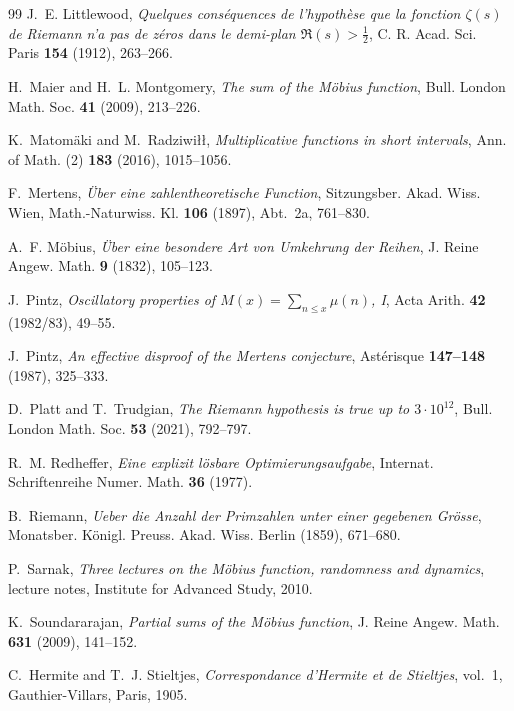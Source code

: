 \documentclass[11pt,reqno]{amsart}
\numberwithin{equation}{section}
\theoremstyle{plain}
\theoremstyle{definition}
\theoremstyle{remark}
\begin{document}
\begin{thebibliography}{99}
J.~E. Littlewood, \emph{Quelques cons\'equences de l'hypoth\`ese que la
fonction $\zeta(s)$ de Riemann n'a pas de z\'eros dans le demi-plan
$\Re(s)>\frac12$}, C. R. Acad. Sci. Paris \textbf{154} (1912), 263--266.

H.~Maier and H.~L. Montgomery, \emph{The sum of the M\"obius function},
Bull. London Math. Soc. \textbf{41} (2009), 213--226.

K.~Matom\"aki and M.~Radziwi\l\l, \emph{Multiplicative functions in short
intervals}, Ann. of Math. (2) \textbf{183} (2016), 1015--1056.

F.~Mertens, \emph{\"Uber eine zahlentheoretische Function}, Sitzungsber.
Akad. Wiss. Wien, Math.-Naturwiss. Kl. \textbf{106} (1897), Abt.~2a,
761--830.

A.~F. M\"obius, \emph{\"Uber eine besondere Art von Umkehrung der Reihen},
J. Reine Angew. Math. \textbf{9} (1832), 105--123.

J.~Pintz, \emph{Oscillatory properties of $M(x)=\sum_{n\le x}\mu(n)$, I},
Acta Arith. \textbf{42} (1982/83), 49--55.

J.~Pintz, \emph{An effective disproof of the Mertens conjecture}, Ast\'erisque
\textbf{147--148} (1987), 325--333.

D.~Platt and T.~Trudgian, \emph{The Riemann hypothesis is true up to
$3\cdot10^{12}$}, Bull. London Math. Soc. \textbf{53} (2021), 792--797.

R.~M. Redheffer, \emph{Eine explizit l\"osbare Optimierungsaufgabe}, Internat.
Schriftenreihe Numer. Math. \textbf{36} (1977).

B.~Riemann, \emph{Ueber die Anzahl der Primzahlen unter einer gegebenen
Gr\"osse}, Monatsber. K\"onigl. Preuss. Akad. Wiss. Berlin (1859), 671--680.

P.~Sarnak, \emph{Three lectures on the M\"obius function, randomness and
dynamics}, lecture notes, Institute for Advanced Study, 2010.

K.~Soundararajan, \emph{Partial sums of the M\"obius function}, J. Reine
Angew. Math. \textbf{631} (2009), 141--152.

C.~Hermite and T.~J. Stieltjes, \emph{Correspondance d'Hermite et de
Stieltjes}, vol.~1, Gauthier-Villars, Paris, 1905.


\end{thebibliography}
\end{document}
